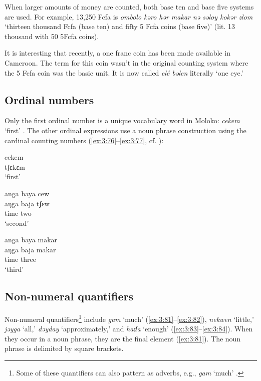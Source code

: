 When larger amounts of money are counted, both base ten and base five systems are used. For example, 13,250 Fcfa is \textit{ombolo kəro hər makar nə səloy kokər zlom} ‘thirteen thousand Fcfa (base ten) and fifty 5 Fcfa coins (base five)’ (lit. 13 thousand with 50 5Fcfa coins).

It is interesting that recently, a one franc coin has been made available in Cameroon. The term for this coin wasn’t in the original counting system where the 5 Fcfa coin was the basic unit. It is now called \textit{el\'{e} bəlen} literally ‘one eye.’ 

\subsection{Ordinal numbers}\label{sec:3.3.3}
\hypertarget{RefHeading1211081525720847}{}
Only the first ordinal number is a unique vocabulary word in Moloko: \textit{cekem} ‘first’ . The other ordinal expressions use a noun phrase construction using the cardinal counting numbers (\ref{ex:3:76}--\ref{ex:3:77}, cf. ):

\ea \label{ex:3:78}
cekem\\
      tʃɛkɛm\\
\glt  ‘first’
\z

\ea \label{ex:3:79}
anga  baya cew\\
\gll  aŋga baja   tʃɛw\\
      {\POSS}   time     two\\
\glt  ‘second’
\z

\ea \label{ex:3:80}
anga  baya  makar\\
\gll  aŋga   baja   makar\\
      {\POSS}   time     three\\
\glt  ‘third’ 
\z

\subsection{Non-numeral quantifiers}\label{sec:3.3.4}
\hypertarget{RefHeading1211101525720847}{}
Non-numeral quantifiers\footnote{Some of these quantifiers can also pattern as adverbs, e.g., \textit{gam} ‘much’ .} include \textit{gam} ‘much' (\ref{ex:3:81}--\ref{ex:3:82}), \textit{nekwen} ‘little,’ \textit{jəyga} ‘all,’ \textit{dəyday} ‘approximately,’ and \textit{haɗa} ‘enough’ (\ref{ex:3:83}--\ref{ex:3:84}). When they occur in a noun phrase, they are the final element (\ref{ex:3:81}). The noun phrase is delimited by square brackets.  

